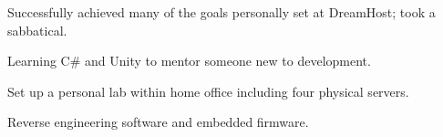 \item Successfully achieved many of the goals personally set at DreamHost; took a sabbatical.
\item Learning C\# and Unity to mentor someone new to development.
\item Set up a personal lab within home office including four physical servers.
\item Reverse engineering software and embedded firmware.
